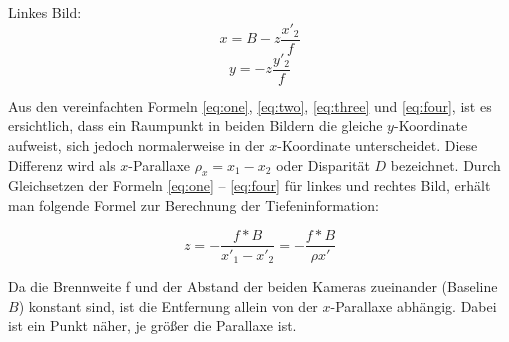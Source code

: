 \noindent Linkes Bild:
\begin{equation}\label{eq:three}
x = B-z \frac{x'_{2}}{f}
\end{equation}
\begin{equation}\label{eq:four}
y = -z \frac{y'_{2}}{f}
\end{equation}

\noindent Aus den vereinfachten Formeln \ref{eq:one}, \ref{eq:two}, \ref{eq:three} und \ref{eq:four}, ist es ersichtlich, dass ein Raumpunkt in beiden Bildern die gleiche $y$-Koordinate aufweist, sich jedoch normalerweise in der $x$-Koordinate unterscheidet. Diese Differenz wird als $x$-Parallaxe 
$\rho_{x} = x_{1} - x_{2}$ oder Disparität $D$ bezeichnet.\newline
\noindent Durch Gleichsetzen der Formeln \ref{eq:one} – \ref{eq:four} für linkes und rechtes Bild, erhält man folgende Formel zur Berechnung der Tiefeninformation:

\begin{equation}
z = -\frac
{f*B}
{x'_{1}-x'_{2}}
=
-\frac
{f*B}
{\rho x'}
\end{equation}

\noindent Da die Brennweite f und der Abstand der beiden Kameras zueinander (Baseline $B$) konstant sind, ist die Entfernung allein von der $x$-Parallaxe abhängig. Dabei ist ein Punkt näher, je größer die Parallaxe ist.

